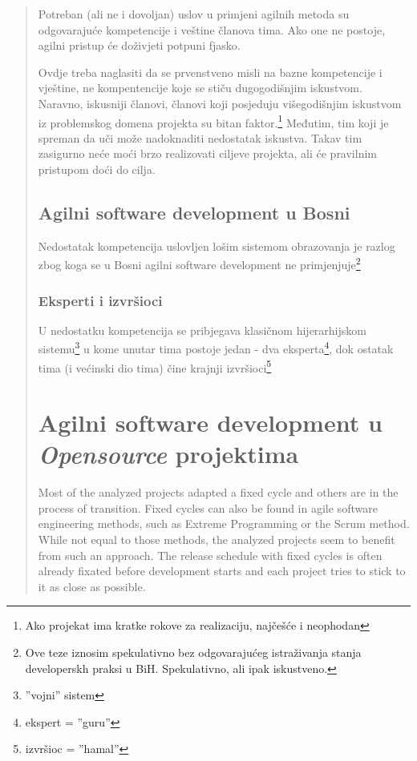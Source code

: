 \documentclass[lmodern, utf8, zavrsni]{fit}
\begin{document}
\begin{quote}
Potreban (ali ne i dovoljan) uslov u primjeni agilnih metoda su odgovarajuće kompetencije i veštine članova tima. Ako one ne postoje, agilni pristup će doživjeti potpuni fjasko.

Ovdje treba naglasiti da se prvenstveno misli na bazne kompetencije i vještine, ne kompentencije koje se stiču dugogodišnjim iskustvom. Naravno, iskusniji članovi, članovi koji posjeduju višegodišnjim iskustvom iz problemskog domena projekta su bitan faktor.\footnote{Ako projekat ima kratke rokove za realizaciju, najčešće i neophodan} Međutim, tim koji je spreman da uči može nadoknaditi nedostatak iskustva. Takav tim zasigurno neće moći brzo realizovati ciljeve projekta, ali će pravilnim pristupom doći do cilja.

\section{Agilni software development u Bosni}

Nedostatak kompetencija uslovljen lošim sistemom obrazovanja je razlog zbog koga se u Bosni agilni software development ne primjenjuje\footnote{Ove teze iznosim spekulativno bez odgovarajućeg istraživanja stanja developerskh praksi u BiH. Spekulativno, ali ipak iskustveno.}

\subsection{Eksperti i izvršioci}

U nedostatku kompetencija se pribjegava klasičnom hijerarhijskom sistemu\footnote{''vojni'' sistem} u kome unutar tima postoje jedan - dva eksperta\footnote{ekspert = ''guru''}, dok ostatak tima (i većinski dio tima) čine krajnji izvršioci\footnote{izvršioc = ''hamal''}


\chapter{Agilni software development u \emph{Opensource} projektima}

Most of the analyzed projects adapted a fixed cycle and others are in the process of transition. Fixed cycles can also be found in agile software engineering methods, such as Extreme Programming or the Scrum method. While not equal to those methods, the analyzed projects seem to benefit from such an approach. The release schedule with fixed cycles is often already fixated before development starts and each project tries to stick to it as close as possible.\citep[str. 95]{Siegel2012}


\end{quote}
\end{document}
